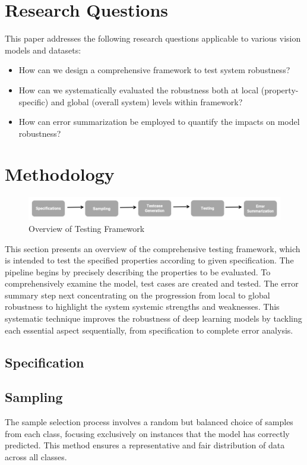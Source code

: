 \documentclass[10pt, conference, a4paper, final]{IEEEtran}
\begin{document}
\section{Research Questions}

This paper addresses the following research questions applicable to various vision models and datasets:

\begin{itemize}
    \item How can we design a comprehensive framework to test system robustness?
    \item How can we systematically evaluated the robustness both at local (property-specific) and global (overall system) levels within framework?
    \item How can error summarization be employed to quantify the impacts on model robustness?
 
\end{itemize}


\section{Methodology}
\begin{figure}{}
    \centering
    \includegraphics[width=\linewidth]{paper_images/frame.pdf}
    \caption{Overview of Testing Framework}
    \label{fig:graph}
\end{figure}


This section presents an overview of the comprehensive testing framework, which is intended to test the specified properties according to given specification. The pipeline begins by precisely describing the properties to be evaluated. To comprehensively examine the model, test cases are created and tested. The error summary step next concentrating on the progression from local to global robustness to highlight the system systemic strengths and weaknesses. This systematic technique improves the robustness of deep learning models by tackling each essential aspect sequentially, from specification to complete error analysis.
\subsection{Specification}
\subsection{Sampling}
 The sample selection process involves a random but balanced choice of samples from each class, focusing exclusively on instances that the model has correctly predicted. This method ensures a representative and fair distribution of data across all classes.
\end{document}
